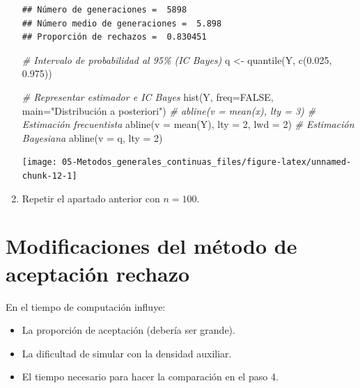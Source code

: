 \documentclass[
]{book}
\newenvironment{Shaded}{\begin{snugshade}}{\end{snugshade}}
\newcommand{\AttributeTok}[1]{\textcolor[rgb]{0.77,0.63,0.00}{#1}}
\newcommand{\CommentTok}[1]{\textcolor[rgb]{0.56,0.35,0.01}{\textit{#1}}}
\newcommand{\ConstantTok}[1]{\textcolor[rgb]{0.00,0.00,0.00}{#1}}
\newcommand{\DecValTok}[1]{\textcolor[rgb]{0.00,0.00,0.81}{#1}}
\newcommand{\FloatTok}[1]{\textcolor[rgb]{0.00,0.00,0.81}{#1}}
\newcommand{\FunctionTok}[1]{\textcolor[rgb]{0.00,0.00,0.00}{#1}}
\newcommand{\NormalTok}[1]{#1}
\newcommand{\OtherTok}[1]{\textcolor[rgb]{0.56,0.35,0.01}{#1}}
\newcommand{\StringTok}[1]{\textcolor[rgb]{0.31,0.60,0.02}{#1}}
\theoremstyle{break}
\theoremstyle{definition}
\theoremstyle{definition}
\theoremstyle{definition}
\theoremstyle{definition}
\theoremstyle{remark}
\begin{document}
\begin{enumerate}
\begin{verbatim}
## Número de generaciones =  5898
## Número medio de generaciones =  5.898
## Proporción de rechazos =  0.830451
\end{verbatim}

\begin{Shaded}
\begin{Highlighting}[]
\CommentTok{\# Intervalo de probabilidad al 95\% (IC Bayes)}
\NormalTok{q }\OtherTok{\textless{}{-}} \FunctionTok{quantile}\NormalTok{(Y, }\FunctionTok{c}\NormalTok{(}\FloatTok{0.025}\NormalTok{, }\FloatTok{0.975}\NormalTok{))}

\CommentTok{\# Representar estimador e IC Bayes}
\FunctionTok{hist}\NormalTok{(Y, }\AttributeTok{freq=}\ConstantTok{FALSE}\NormalTok{, }\AttributeTok{main=}\StringTok{"Distribución a posteriori"}\NormalTok{)}
\CommentTok{\# abline(v = mean(x), lty = 3) \# Estimación frecuentista}
\FunctionTok{abline}\NormalTok{(}\AttributeTok{v =} \FunctionTok{mean}\NormalTok{(Y), }\AttributeTok{lty =} \DecValTok{2}\NormalTok{, }\AttributeTok{lwd =} \DecValTok{2}\NormalTok{)  }\CommentTok{\# Estimación Bayesiana}
\FunctionTok{abline}\NormalTok{(}\AttributeTok{v =}\NormalTok{ q, }\AttributeTok{lty =} \DecValTok{2}\NormalTok{)}
\end{Highlighting}
\end{Shaded}

  \begin{center}\texttt{[image: 05-Metodos\_generales\_continuas\_files/figure-latex/unnamed-chunk-12-1]} \end{center}
\item
  Repetir el apartado anterior con \(n=100\).
\end{enumerate}

\hypertarget{modificaciones-del-muxe9todo-de-aceptaciuxf3n-rechazo}{%
\section{Modificaciones del método de aceptación rechazo}\label{modificaciones-del-muxe9todo-de-aceptaciuxf3n-rechazo}}

En el tiempo de computación influye:

\begin{itemize}
\item
  La proporción de aceptación (debería ser grande).
\item
  La dificultad de simular con la densidad auxiliar.
\item
  El tiempo necesario para hacer la comparación en el paso 4.
\end{itemize}
\end{document}
